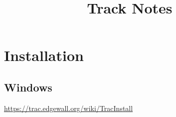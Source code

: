 \documentclass{report}
\title{Track Notes}
\begin{document}
\tableofcontents

\chapter{Installation}
\section{Windows}
\url{https://trac.edgewall.org/wiki/TracInstall}
\end{document}
